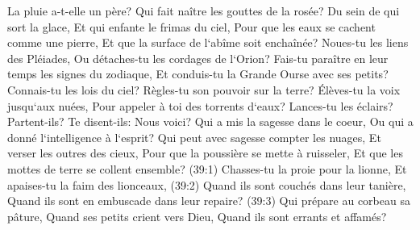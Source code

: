 \verse La pluie a-t-elle un père? Qui fait naître les gouttes de la rosée? 
\verse Du sein de qui sort la glace, Et qui enfante le frimas du ciel, 
\verse Pour que les eaux se cachent comme une pierre, Et que la surface de l`abîme soit enchaînée? 
\verse Noues-tu les liens des Pléiades, Ou détaches-tu les cordages de l`Orion? 
\verse Fais-tu paraître en leur temps les signes du zodiaque, Et conduis-tu la Grande Ourse avec ses petits? 
\verse Connais-tu les lois du ciel? Règles-tu son pouvoir sur la terre? 
\verse Élèves-tu la voix jusqu`aux nuées, Pour appeler à toi des torrents d`eaux? 
\verse Lances-tu les éclairs? Partent-ils? Te disent-ils: Nous voici? 
\verse Qui a mis la sagesse dans le coeur, Ou qui a donné l`intelligence à l`esprit? 
\verse Qui peut avec sagesse compter les nuages, Et verser les outres des cieux, 
\verse Pour que la poussière se mette à ruisseler, Et que les mottes de terre se collent ensemble? 
\verse (39:1) Chasses-tu la proie pour la lionne, Et apaises-tu la faim des lionceaux, 
\verse (39:2) Quand ils sont couchés dans leur tanière, Quand ils sont en embuscade dans leur repaire? 
\verse (39:3) Qui prépare au corbeau sa pâture, Quand ses petits crient vers Dieu, Quand ils sont errants et affamés? 


